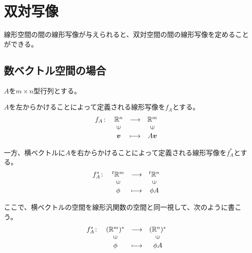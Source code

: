 \documentclass[../../../topic_linear-algebra]{subfiles}
\begin{document}
\sectionline
\section{双対写像}

線形空間の間の線形写像が与えられると、双対空間の間の線形写像を定めることができる。

\subsection{数ベクトル空間の場合}

$A$を$m \times n$型行列とする。

$A$を左からかけることによって定義される線形写像を$f_A$とする。
\begin{equation*}
  \begin{array}{lclc}
    f_A \colon & \mathbb{R}^n         & \longrightarrow & \mathbb{R}^m          \\
            & \rotatebox{90}{$\in$} &                 & \rotatebox{90}{$\in$} \\
            & \vb*{v}               & \longmapsto     & A \vb*{v}
  \end{array}
\end{equation*}

一方、横ベクトルに$A$を右からかけることによって定義される線形写像を$f_A^*$とする。
\begin{equation*}
  \begin{array}{lclc}
    f_A^* \colon & {}^t\mathbb{R}^m & \longrightarrow & {}^t\mathbb{R}^n \\
            & \rotatebox{90}{$\in$} &                 & \rotatebox{90}{$\in$} \\
            & \phi               & \longmapsto     & \phi A
  \end{array}
\end{equation*}

ここで、横ベクトルの空間を線形汎関数の空間と同一視して、次のように書こう。
\begin{equation*}
  \begin{array}{lclc}
    f_A^* \colon & (\mathbb{R}^m)^* & \longrightarrow & (\mathbb{R}^n)^* \\
            & \rotatebox{90}{$\in$} &                 & \rotatebox{90}{$\in$} \\
            & \phi               & \longmapsto     & \phi A
  \end{array}
\end{equation*}
\end{document}
